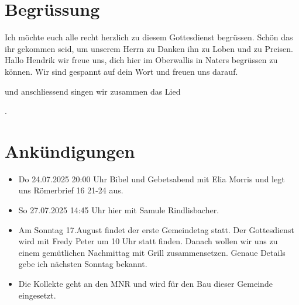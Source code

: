 \documentclass{../../inc/mybib}
\begin{document}
\section{Begrüssung}

Ich möchte euch alle recht herzlich zu diesem Gottesdienst begrüssen. Schön das ihr gekommen seid, um unserem Herrn zu Danken ihn zu Loben und zu Preisen.
Hallo Hendrik wir freue uns, dich hier im Oberwallis in Naters begrüssen zu können. Wir sind gespannt auf dein Wort und freuen uns darauf.

\beten{} und anschliessend singen wir zusammen das Lied

{}.

\section{Ankündigungen}
\begin{itemize}
    \item {} Do 24.07.2025 20:00 Uhr Bibel und Gebetsabend mit Elia Morris  und legt uns Römerbrief 16 21-24 aus.
    \item {} So 27.07.2025 14:45 Uhr hier mit Samule Rindlisbacher.
    \item {} Am Sonntag 17.August findet der erste Gemeindetag statt. Der Gottesdienst wird mit Fredy Peter um 10 Uhr statt finden. Danach wollen wir uns zu einem gemütlichen Nachmittag mit Grill zusammensetzen. Genaue Details gebe ich nächsten Sonntag bekannt.
    \item {} Die Kollekte geht an den MNR und wird für den Bau dieser Gemeinde eingesetzt.
\end{itemize}
\end{document}
